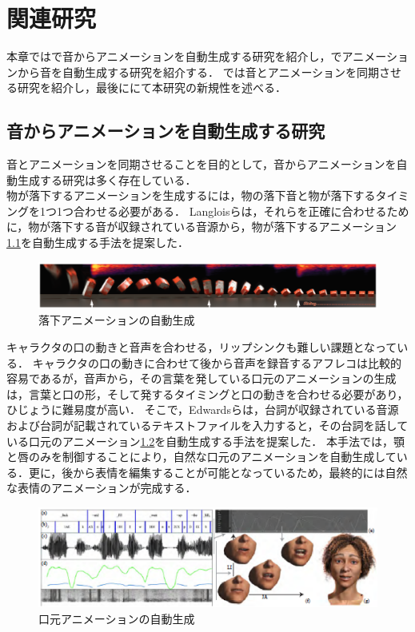 \chapter{関連研究}
\label{chap:previousworks}
本章ではで音からアニメーションを自動生成する研究を紹介し，でアニメーションから音を自動生成する研究を紹介する．
では音とアニメーションを同期させる研究を紹介し，最後ににて本研究の新規性を述べる．

\section{音からアニメーションを自動生成する研究}\label{sec:generate_animation}
音とアニメーションを同期させることを目的として，音からアニメーションを自動生成する研究は多く存在している．\\
\indent
物が落下するアニメーションを生成するには，物の落下音と物が落下するタイミングを1つ1つ合わせる必要がある．
Langloisら\cite{IFA}は，それらを正確に合わせるために，物が落下する音が収録されている音源から，物が落下するアニメーション\ref{fig:IFA}を自動生成する手法を提案した．
\begin{figure}[h]
	\centering
	\includegraphics[width=15cm]{fig/chap2/IFA.eps}
	\caption{落下アニメーションの自動生成}
	\label{fig:IFA}
\end{figure}

\indent
キャラクタの口の動きと音声を合わせる，リップシンクも難しい課題となっている．
キャラクタの口の動きに合わせて後から音声を録音するアフレコは比較的容易であるが，音声から，その言葉を発している口元のアニメーションの生成は，言葉と口の形，そして発するタイミングと口の動きを合わせる必要があり，ひじょうに難易度が高い．
そこで，Edwardsら\cite{JALI}は，台詞が収録されている音源および台詞が記載されているテキストファイルを入力すると，その台詞を話している口元のアニメーション\ref{fig:JALI}を自動生成する手法を提案した．
本手法では，顎と唇のみを制御することにより，自然な口元のアニメーションを自動生成している．更に，後から表情を編集することが可能となっているため，最終的には自然な表情のアニメーションが完成する．
\begin{figure}[h]
	\centering
	\includegraphics[width=15cm]{fig/chap2/JALI.eps}
	\caption{口元アニメーションの自動生成}
	\label{fig:JALI}
\end{figure}

